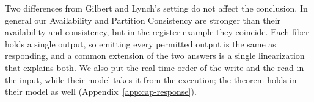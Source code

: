 Two differences from Gilbert and Lynch's setting do not affect the conclusion.
In general our Availability and Partition Consistency are stronger than their
availability and consistency, but in the register example they coincide.  Each
fiber holds a single output, so emitting every permitted output is the same as
responding, and a common extension of the two answers is a single linearization
that explains both.  We also put the real-time order of the write and the read
in the input, while their model takes it from the execution; the theorem holds
in their model as well (Appendix~\ref{app:cap-response}).

